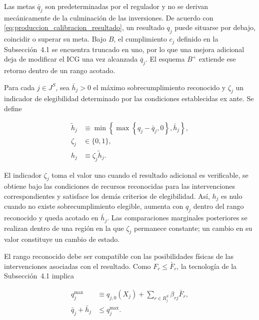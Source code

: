 Las metas \(\bar q_j\) son predeterminadas por el regulador y no se derivan mecánicamente de la culminación de las inversiones. De acuerdo con \eqref{eq:produccion_calibracion_resultado}, un resultado \(q_j\) puede situarse por debajo, coincidir o superar su meta. Bajo \(B\), el cumplimiento \(c_j\) definido en la Subsección~4.1 se encuentra truncado en uno, por lo que una mejora adicional deja de modificar el ICG una vez alcanzada \(\bar q_j\). El esquema \(B^{+}\) extiende ese retorno dentro de un rango acotado.

Para cada \(j\in J^{S}\), sea \(\bar h_j>0\) el máximo sobrecumplimiento reconocido y \(\zeta_j\) un indicador de elegibilidad determinado por las condiciones establecidas ex ante. Se define

\begin{subequations}
\label{eq:sobrecumplimiento_bplus}
\begin{align}
\widetilde h_j
&\equiv
\min
\left\{
\max\left\{q_j-\bar q_j,0\right\},
\bar h_j
\right\},
\label{eq:sobrecumplimiento_potencial_bplus}
\\
\zeta_j
&\in
\{0,1\},
\label{eq:elegibilidad_bplus}
\\
h_j
&\equiv
\zeta_j\widetilde h_j.
\label{eq:sobrecumplimiento_reconocido_bplus}
\end{align}
\end{subequations}

El indicador \(\zeta_j\) toma el valor uno cuando el resultado adicional es verificable, se obtiene bajo las condiciones de recursos reconocidas para las intervenciones correspondientes y satisface los demás criterios de elegibilidad. Así, \(h_j\) es nulo cuando no existe sobrecumplimiento elegible, aumenta con \(q_j\) dentro del rango reconocido y queda acotado en \(\bar h_j\). Las comparaciones marginales posteriores se realizan dentro de una región en la que \(\zeta_j\) permanece constante; un cambio en su valor constituye un cambio de estado.

El rango reconocido debe ser compatible con las posibilidades físicas de las intervenciones asociadas con el resultado. Como \(F_r\leq\bar F_r\), la tecnología de la Subsección~4.1 implica

\begin{subequations}
\label{eq:factibilidad_sobrecumplimiento_bplus}
\begin{align}
q_j^{\max}
&\equiv
q_{j,0}(X_j)
+
\sum_{r\in R_j^{S}}
\beta_{rj}\bar F_r,
\label{eq:resultado_maximo_bplus}
\\
\bar q_j+\bar h_j
&\leq
q_j^{\max}.
\label{eq:compatibilidad_sobrecumplimiento_bplus}
\end{align}
\end{subequations}

